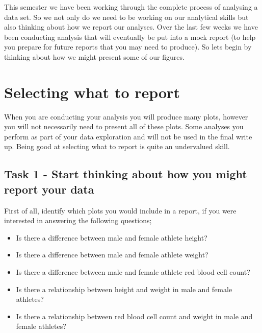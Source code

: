 \documentclass[
]{book}
\providecommand{\tightlist}{%
  \setlength{\itemsep}{0pt}\setlength{\parskip}{0pt}}
\begin{document}
This semester we have been working through the complete process of analysing a data set. So we not only do we need to be working on our analytical skills but also thinking about how we report our analyses. Over the last few weeks we have been conducting analysis that will eventually be put into a mock report (to help you prepare for future reports that you may need to produce). So lets begin by thinking about how we might present some of our figures.

\hypertarget{selecting-what-to-report}{%
\section{Selecting what to report}\label{selecting-what-to-report}}

When you are conducting your analysis you will produce many plots, however you will not necessarily need to present all of these plots. Some analyses you perform as part of your data exploration and will not be used in the final write up. Being good at selecting what to report is quite an undervalued skill.

\hypertarget{task-1---start-thinking-about-how-you-might-report-your-data}{%
\subsection{Task 1 - Start thinking about how you might report your data}\label{task-1---start-thinking-about-how-you-might-report-your-data}}

First of all, identify which plots you would include in a report, if you were interested in answering the following questions;

\begin{itemize}
\tightlist
\item
  Is there a difference between male and female athlete height?
\item
  Is there a difference between male and female athlete weight?
\item
  Is there a difference between male and female athlete red blood cell count?
\item
  Is there a relationship between height and weight in male and female athletes?
\item
  Is there a relationship between red blood cell count and weight in male and female athletes?
\end{itemize}
\end{document}
